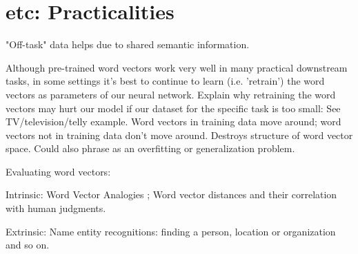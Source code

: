\documentclass[12pt]{article}
\begin{document}
\section{etc: Practicalities}
\par "Off-task" data helps due to shared semantic information.
\par Although pre-trained word vectors work very well in many practical downstream tasks, in some settings it's best to continue to learn (i.e. 'retrain') the word vectors as parameters of our neural network. Explain why retraining the word vectors may hurt our model if our dataset for the specific task is too small: See TV/television/telly example. Word vectors in training data move around; word vectors not in training data don't move around. Destroys structure of word vector space. Could also phrase as an overfitting or generalization problem.
\par Evaluating word vectors:
\ulb
\item Intrinsic: Word Vector Analogies ; Word vector distances and their correlation with human judgments.
\item Extrinsic: Name entity recognitions: finding a person, location or organization and so on.
\ule
\end{document}
